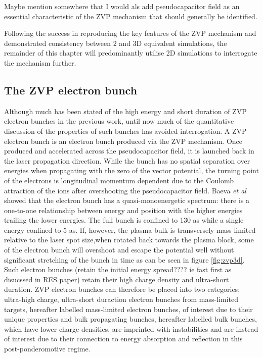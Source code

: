 Maybe mention somewhere that I would als add pseudocapacitor field as an essential characteristic of the ZVP mechanism that should generally be identified.

Following the success in reproducing the key features of the \ac{ZVP} mechanism and demonstrated consistency between 2 and 3D equivalent simulations, the remainder of this chapter will predominantly utilise 2D simulations to interrogate the mechanism further.
\subsection{The ZVP electron bunch}
 Although much has been stated of the high energy and short duration of ZVP electron bunches in the previous work, until now much of the quantitative discussion of the properties of such bunches has avoided interrogation. A ZVP electron bunch is an electron bunch produced via the ZVP mechanism. Once produced and accelerated across the pseudocapacitor field, it is launched back in the laser propagation direction. While the bunch has no spatial separation over energies when propagating with the zero of the vector potential, the turning point of the electrons is longitudinal momentum dependent due to the Coulomb attraction of the ions after overshooting the pseudocapacitor field. Baeva \textit{et al} showed that the electron bunch has a quasi-monoenergetic spectrum: there is a one-to-one relationship between energy and position with the higher energies trailing the lower energies. The full bunch is confined to 130 as while a single energy confined to 5 as. If, however, the plasma bulk is transversely mass-limited relative to the laser spot size,when rotated back towards the plasma block, some of the electron bunch will overshoot and escape the potential well without significant stretching of the bunch in time as can be seen in figure \ref{fig:zvp3d}. Such electron bunches (retain the initial energy spread???? ie fast first as disucssed in RES paper) retain their high charge density and ultra-short duration. ZVP electron bunches can therefore be placed into two categories: ultra-high charge, ultra-short duraction electron bunches from mass-limited targets, hereafter labelled mass-limited electron bunches, of interest due to their unique properties and bulk propagating bunches, hereafter labelled bulk bunches, which have lower charge densities, are imprinted with instabilities and are instead of interest due to their connection to energy absorption and reflection in this post-ponderomotive regime.
 

